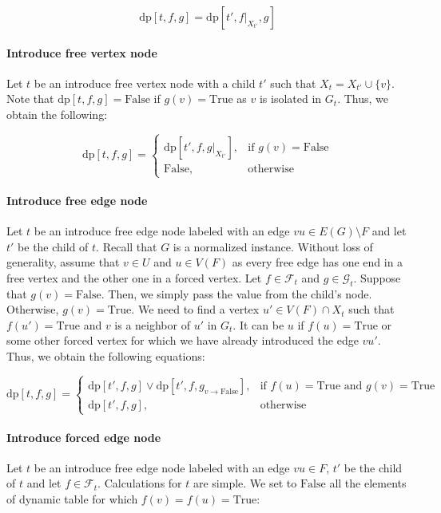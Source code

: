 \documentclass[en]{pracamgr}
\theoremstyle{definition}
\newcommand{\dpt}[1]{\textrm{dp}[#1]}
\newcommand{\true}{\textrm{True}}
\newcommand{\false}{\textrm{False}}
\begin{document}
\begin{equation*}
	\dpt{t,f,g}= \dpt{t',f|_{X_{t'}},g}
\end{equation*}

\paragraph{Introduce free vertex node} Let $t$ be an introduce free vertex node with a child $t'$ such that $X_t = X_{t'} \cup \{v\}$. Note that $\dpt{t,f,g}=\false$ if $g(v)=\true$ as $v$ is isolated in $G_t$. Thus, we obtain the following:

\begin{equation*}
	\dpt{t,f,g} =
	\begin{cases}
		\dpt{t',f,g|_{X_{t'}}}, & \text{if $g(v)=\false$} \\
		\false, &\text{otherwise}
	\end{cases}
\end{equation*}

\paragraph{Introduce free edge node} Let $t$ be an introduce free edge node labeled with an edge $vu \in E(G) \setminus F$ and let $t'$ be the child of $t$. Recall that $G$ is a normalized instance. Without loss of generality, assume that $v \in U$ and $u \in V(F)$ as every free edge has one end in a free vertex and the other one in a forced vertex. Let $f \in \mathcal{F}_t$ and $g \in \mathcal{G}_t$. Suppose that $g(v)=\false$. Then, we simply pass the value from the child's node. Otherwise, $g(v)=\true$. We need to find a vertex $u' \in V(F) \cap X_t$ such that $f(u')=\true$ and $v$ is a neighbor of $u'$ in $G_t$. It can be $u$ if $f(u)=\true$ or some other forced vertex for which we have already introduced the edge $vu'$. Thus, we obtain the following equations:

\begin{equation*}
	\dpt{t,f,g} = 
		\begin{cases}
			\dpt{t',f,g} \lor \dpt{t',f,g_{v \rightarrow \false}}, & \text{if $f(u)=\true$ and $g(v)=\true$} \\
			\dpt{t',f,g}, & \text{otherwise}
		\end{cases}	
\end{equation*}

\paragraph{Introduce forced edge node} Let $t$ be an introduce free edge node labeled with an edge $vu \in F$, $t'$ be the child of $t$ and let $f \in \mathcal{F}_t$. Calculations for $t$ are simple. We set to $\false$ all the elements of dynamic table for which $f(v)=f(u)=\true$:
\end{document}
